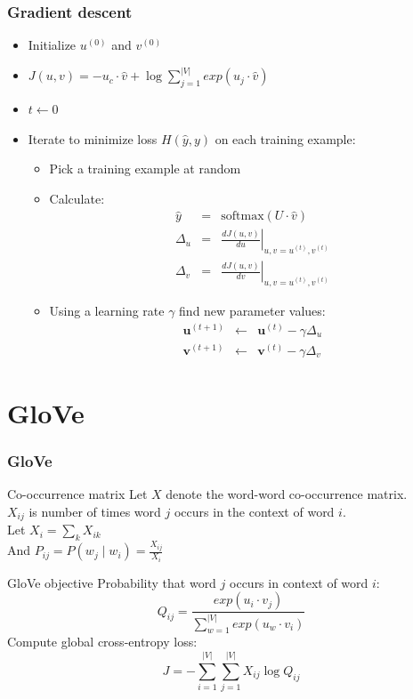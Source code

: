 \begin{frame}
\frametitle{Gradient descent}
\begin{itemize}[<+->]
\item Initialize $u^{(0)}$ and $v^{(0)}$ 
\item $J(u,v) = - u_c \cdot \hat{v} + \log \sum_{j=1}^{|V|} exp(u_j \cdot \hat{v})$
\item $t \leftarrow 0$
\item Iterate to minimize loss $H(\hat{y}, y)$ on each training example:
\begin{itemize}[<+->]
\item Pick a training example at random
\item Calculate: 
\begin{eqnarray*}
	\hat{y} &=& \textrm{softmax}(U \cdot \hat{v}) \\
	\Delta_u &=& \left. \frac{d J(u,v)}{d u}  \right|_{u,v = u^{(t)}, v^{(t)}} \\
	\Delta_v &=& \left. \frac{d J(u,v)}{d v}  \right|_{u,v = u^{(t)}, v^{(t)}}
\end{eqnarray*}
\item Using a learning rate $\gamma$ find new parameter values:
\begin{eqnarray*}
	\textbf{u}^{(t+1)} &\leftarrow& \textbf{u}^{(t)} - \gamma \Delta_u \\
	\textbf{v}^{(t+1)} &\leftarrow& \textbf{v}^{(t)} - \gamma \Delta_v
\end{eqnarray*}
\end{itemize}
\end{itemize}
\end{frame}

\section{GloVe}
\frame{\tableofcontents[currentsection]}

\begin{frame}
\frametitle{GloVe}
\begin{alertblock}{Co-occurrence matrix}
Let $X$ denote the word-word co-occurrence matrix.\\
$X_{ij}$ is number of times word $j$ occurs in the context of word $i$.\\
Let $X_i = \sum_k X_{ik}$ \\
And $P_{ij} = P(w_j \mid w_i) = \frac{X_{ij}}{X_i}$	
\end{alertblock}
\pause
\begin{alertblock}{GloVe objective}
Probability that word $j$ occurs in context of word $i$:
\[ Q_{ij} = \frac{exp(u_i \cdot v_j)}{\sum_{w=1}^{|V|} exp(u_w \cdot v_i) } \]
Compute global cross-entropy loss:
\[ J = - \sum_{i=1}^{|V|} \sum_{j=1}^{|V|} X_{ij} \log Q_{ij} \]
\end{alertblock}
\end{frame}

